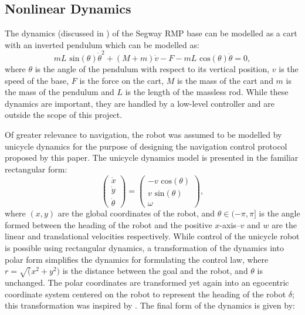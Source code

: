 \documentclass[journal]{IEEEtran}
\begin{document}
\subsection{Nonlinear Dynamics}
The dynamics (discussed in \cite{castro2012modeling}) of the Segway RMP base can be modelled as a cart with an inverted pendulum which can be modelled as:
\begin{equation}
 mL\text{ sin}(\theta)\dot{\theta}^2 + (M+m)\dot{v} - F - mL\text{ cos}(\theta)\ddot{\theta} = 0, 
\end{equation}
where $\theta$ is the angle of the pendulum with respect to its vertical position, $v$ is the speed of the base, $F$ is the force on the cart, $M$ is the mass of the cart and $m$ is the mass of the pendulum and $L$ is the length of the massless rod. While these dynamics are important, they are handled by a low-level controller and are outside the scope of this project. 

Of greater relevance to navigation, the robot was assumed to be modelled by unicycle dynamics for the purpose of designing the navigation control protocol proposed by this paper. The unicycle dynamics model is presented in the familiar rectangular form:
$$
\left(
\begin{matrix}
\dot{x}\\
\dot{y}\\
\dot{\theta}
\end{matrix}
\right)
=
\left(
\begin{matrix}
- v \text{ cos}(\theta)\\
v \text{ sin}(\theta)\\
\omega
\end{matrix}
\right),
$$
where $(x,y)$ are the global coordinates of the robot, and $\theta \in (-\pi ,\pi]$ is the angle formed between the heading of the robot and the positive $x$-axis--$v$ and $w$ are the linear and translational velocities respectively. While control of the unicycle robot is possible using rectangular dynamics, a transformation of the dynamics into polar form simplifies the dynamics for formulating the control law, where $r=\sqrt(x^2+y^2)$ is the distance between the goal and the robot, and $\theta$ is unchanged. The polar coordinates are transformed yet again into an egocentric coordinate system centered on the robot to represent the heading of the robot $\delta$; this transformation was inspired by \cite{park2011}. The final form of the dynamics is given by:  
\end{document}
